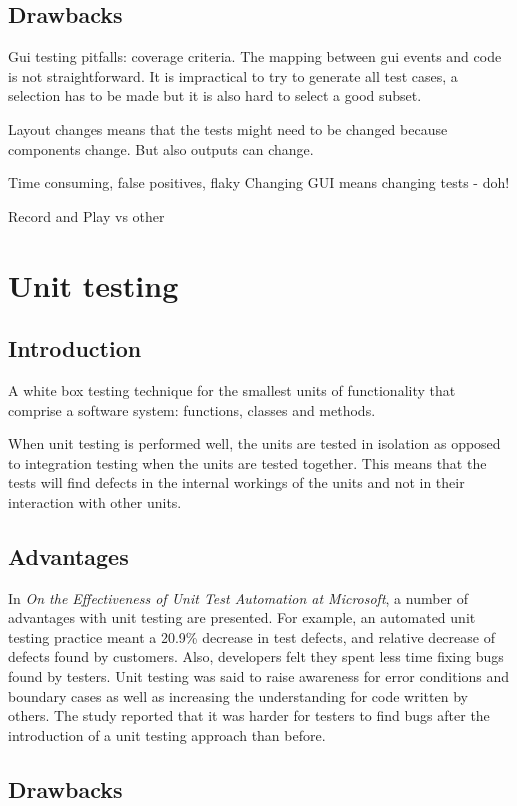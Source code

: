 \documentclass{article}
\begin{document}
		\subsection{Drawbacks}
		Gui testing pitfalls: coverage criteria. The mapping between gui events and code is not straightforward. It is impractical to try to generate all test cases, a selection has to be made but it is also hard to select a good subset. \cite{pitfalls}

		Layout changes means that the tests might need to be changed because components change. But also outputs can change. \cite{pitfalls}

		Time consuming, false positives, flaky
		Changing GUI means changing tests - doh!

		Record and Play vs other

	\section{Unit testing}
		\subsection{Introduction}
		A white box testing technique for the smallest units of functionality that comprise a software system: functions, classes and methods. 

		When unit testing is performed well, the units are tested in isolation as opposed to integration testing when the units are tested together. This means that the tests will find defects in the internal workings of the units and not in their interaction with other units.

		\subsection{Advantages}
		In \textit{On the Effectiveness of Unit Test Automation at Microsoft}, a number of advantages with unit testing are presented. For example, an automated unit testing practice meant a 20.9\% decrease in test defects, and relative decrease of defects found by customers. Also, developers felt they spent less time fixing bugs found by testers. Unit testing was said to raise awareness for error conditions and boundary cases as well as increasing the understanding for code written by others. The study reported that it was harder for testers to find bugs after the introduction of a unit testing approach than before. \cite{unit}

		\subsection{Drawbacks}
\end{document}
